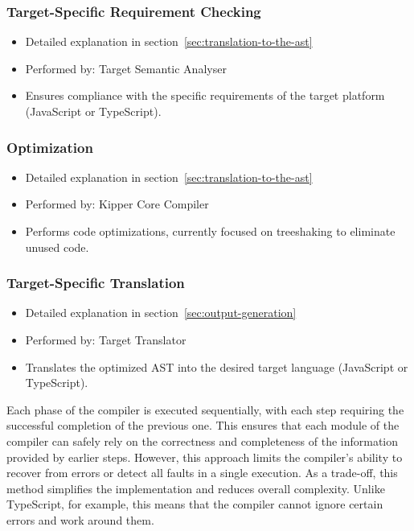 \subsubsection{Target-Specific Requirement Checking}
\begin{itemize}
	\item Detailed explanation in section~\ref{sec:translation-to-the-ast}
	\item Performed by: Target Semantic Analyser
	\item Ensures compliance with the specific requirements of the target platform (JavaScript or TypeScript).
\end{itemize}

\subsubsection{Optimization}
\begin{itemize}
	\item Detailed explanation in section~\ref{sec:translation-to-the-ast}
	\item Performed by: Kipper Core Compiler
	\item Performs code optimizations, currently focused on treeshaking to eliminate unused code.
\end{itemize}

\subsubsection{Target-Specific Translation}
\begin{itemize}
\item Detailed explanation in section~\ref{sec:output-generation}
\item Performed by: Target Translator
\item Translates the optimized AST into the desired target language (JavaScript or TypeScript).
\end{itemize}

Each phase of the compiler is executed sequentially, with each step requiring the successful completion of the previous one. This ensures that each module of the compiler can safely rely on the correctness and completeness of the information provided by earlier steps. However, this approach limits the compiler's ability to recover from errors or detect all faults in a single execution. As a trade-off, this method simplifies the implementation and reduces overall complexity. Unlike TypeScript, for example, this means that the compiler cannot ignore certain errors and work around them. 


